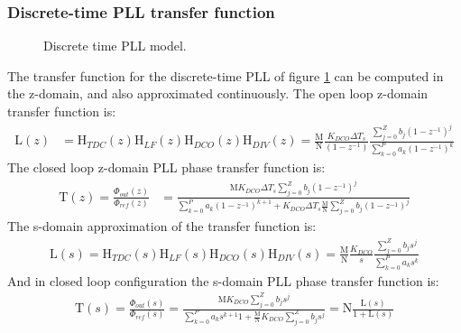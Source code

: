 \subsubsection{Discrete-time PLL transfer function}\label{discrete_pll_tf}
	\begin{figure}[htb!]
		\center
		\caption{Discrete time PLL model.}
		\label{fig:discrete_pll2}
	\end{figure}
	The transfer function for the discrete-time PLL of figure \ref{fig:discrete_pll2} can be computed in the z-domain, and also approximated continuously. The open loop z-domain transfer function is:
	\begin{align}
		\mathrm{L}(z) &= \mathrm{H}_{TDC}(z)\mathrm{H}_{LF}(z)\mathrm{H}_{DCO}(z)\mathrm{H}_{DIV}(z)
		= \frac{\mathrm{M}}{\mathrm{N}}\frac{K_{DCO}\Delta T_s}{(1-z^{-1})}\frac{\sum_{j=0}^Z b_j(1-z^{-1})^j}{\sum_{k=0}^P a_k(1-z^{-1})^k}\label{eq:z_open_loop}
	\end{align}
	The closed loop z-domain PLL phase transfer function is:
	\begin{align}
		\mathrm{T}(z) = \frac{\Phi_{out}(z)}{\Phi_{ref}(z)} &= \frac{\mathrm{M}K_{DCO}\Delta T_s\sum_{j=0}^Z b_j(1-z^{-1})^j}{\sum_{k=0}^P a_k(1-z^{-1})^{k+1} + K_{DCO}\Delta T_s\frac{\mathrm{M}}{\mathrm{N}}\sum_{j=0}^Z b_j(1-z^{-1})^j}%
	\end{align}
	The s-domain approximation of the transfer function is:
	\begin{align}
		\mathrm{L}(s) = \mathrm{H}_{TDC}(s)\mathrm{H}_{LF}(s)\mathrm{H}_{DCO}(s)\mathrm{H}_{DIV}(s) = \frac{\mathrm{M}}{\mathrm{N}}\frac{K_{DCO}}{s} \frac{\sum_{j=0}^Z b_js^j}{\sum_{k=0}^P a_ks^k}
	\end{align}
	And in closed loop configuration the s-domain PLL phase transfer function is:
	\begin{align}
		\mathrm{T}(s)=\frac{\Phi_{out}(s)}{\Phi_{ref}(s)} = \frac{\mathrm{M}K_{DCO}\sum_{j=0}^Z b_js^j}{\sum_{k=0}^P a_ks^{k+1}1 + \frac{\mathrm{M}}{\mathrm{N}}K_{DCO}\sum_{j=0}^Z b_js^j} = \mathrm{N}\frac{\mathrm{L}(s)}{1+\mathrm{L}(s)}
	\end{align}


